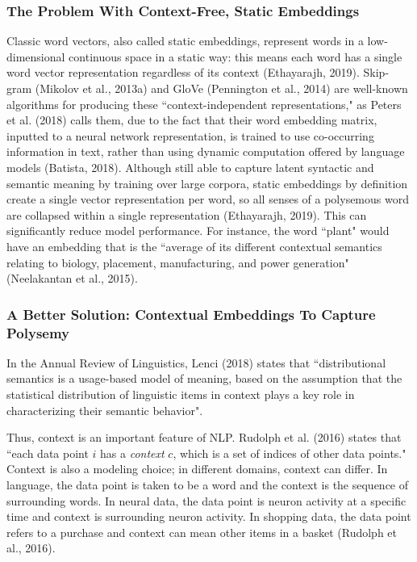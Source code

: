 \subsubsection{The Problem With Context-Free, Static Embeddings} \label{sec:ProblemWithStaticEmbs}

Classic word vectors, also called static embeddings, represent words in a low-dimensional continuous space in a static way: this means each word has a single word vector representation regardless of its context (Ethayarajh, 2019). Skip-gram (Mikolov et al., 2013a) and GloVe (Pennington et al., 2014) are well-known algorithms for producing these ``context-independent representations," as Peters et al. (2018) calls them, due to the fact that their word embedding matrix, inputted to a neural network representation, is trained to use co-occurring information in text, rather than using dynamic computation offered by language models (Batista, 2018). Although still able to capture latent syntactic and semantic meaning by training over large corpora, static embeddings by definition create a single vector representation per word, so all senses of a polysemous word are collapsed within a single representation (Ethayarajh, 2019). This can significantly reduce model performance. For instance, the word ``plant" would have an embedding that is the ``average of its different contextual semantics relating to biology, placement, manufacturing, and power generation" (Neelakantan et al., 2015). 

\subsubsection{A Better Solution: Contextual Embeddings To Capture Polysemy} \label{sec:SolutionWithContextEmbs}

In the Annual Review of Linguistics, Lenci (2018) states that ``distributional semantics is a usage-based model of meaning, based on the assumption that the statistical distribution of linguistic items in context plays a key role in characterizing their semantic behavior".

Thus, context is an important feature of NLP. Rudolph et al. (2016) states that ``each data point $i$ has a \emph{context} $c$, which is a set of indices of other data points." Context is also a modeling choice; in different domains, context can differ. In language, the data point is taken to be a word and the context is the sequence of surrounding words. In neural data, the data point is neuron activity at a specific time and context is surrounding neuron activity. In shopping data, the data point refers to a purchase and context can mean other items in a basket (Rudolph et al., 2016). 

